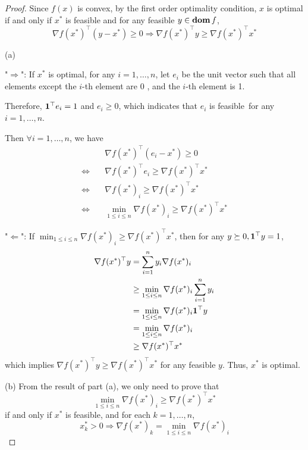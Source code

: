 \documentclass[11pt]{article}
\newcommand{\grad}{\nabla}
\newcommand{\T}{^\top}
\begin{document}
\begin{proof}
Since $f(x)$ is convex, by the first order optimality condition, $x$ is optimal if and only if $x^*$ is feasible and for any feasible $y\in\mathop{\textbf{dom}} f$,
\[
\grad f(x^*)\T (y - x^*) \geq 0 \Rightarrow \grad f(x^*)\T y \geq  \grad f(x^*)\T x^*
\]

(a) 

"$\Rightarrow$": 
If $x^*$ is optimal, for any $i = 1, \dots, n$, let $e_i$ be the unit vector such that all elements except the $i$-th element are 0 , and the $i$-th element is 1.

Therefore, $\mathbf 1^{\top} e_i=1$ and $e_i \geq 0$, which indicates that $e_i$ is feasible\, for any $i = 1, \dots, n$. 

Then $\forall i = 1, \dots, n$, we have
$$
\begin{aligned}
& \nabla f\left(x^*\right)^{\top}\left(e_i-x^*\right) \geq 0 \\
\Leftrightarrow\quad & \nabla f\left(x^*\right)^{\top} e_i \geq \nabla f\left(x^*\right)^{\top} x^*\\
\Leftrightarrow\quad & \nabla f\left(x^*\right)_i \geq \nabla f\left(x^*\right)^{\top} x^*\\
\Leftrightarrow\quad & \min _{1 \leq i \leq n} \nabla f\left(x^*\right)_i \geq \nabla f\left(x^*\right)^{\top} x^*
\end{aligned}
$$

"$\Leftarrow$":
If $\min_{1 \leq i \leq n} \nabla f\left(x^*\right)_i \geq \nabla f\left(x^*\right)^{\top} x^*$, then for any $y\succeq 0, \ones\T y = 1$,
\begin{align*}
    \grad f(x^*)\T y
    & = \sum_{i=1}^{n} y_i \grad f(x^*)_i\\
    & \geq \min_{1 \leq i \leq n} \grad f(x^*)_i \sum_{i=1}^{n} y_i \\
    & = \min_{1 \leq i \leq n} \grad f(x^*)_i \ones\T y\\
    & = \min_{1 \leq i \leq n} \grad f(x^*)_i\\
    & \geq \grad f(x^*)\T x^*
\end{align*}
which implies $\grad f(x^*)\T y \geq \grad f(x^*)\T x^*$ for any feasible $y$. Thus, $x^*$ is optimal.

(b) From the result of part (a), we only need to prove that 
$$\min_{1\leq i \leq n} \grad f(x^*)_i \geq \grad f(x^*)\T x^*$$
if and only if $x^*$ is feasible, and for each $k = 1, \dots, n$, 
$$x_k^* > 0 \Rightarrow \grad f(x^*)_k = \min_{1\leq i\leq n}\grad f(x^*)_i$$



\end{proof}
\end{document}

